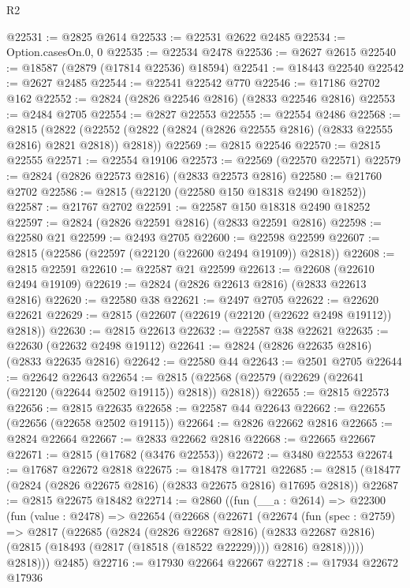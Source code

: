 \begin{lexlean}{R2}
\begin{coremodule}
@22531 := @2825 @2614
@22533 := @22531 @2622 @2485
@22534 := Option.casesOn.{0, 0}
@22535 := @22534 @2478
@22536 := @2627 @2615
@22540 := @18587 (@2879 (@17814 @22536) @18594)
@22541 := @18443 @22540
@22542 := @2627 @2485
@22544 := @22541 @22542 @770
@22546 := @17186 @2702 @162
@22552 := @2824 (@2826 @22546 @2816) (@2833 @22546 @2816)
@22553 := @2484 @2705
@22554 := @2827 @22553
@22555 := @22554 @2486
@22568 := @2815
    (@2822 (@22552 (@2822 (@2824 (@2826 @22555 @2816) (@2833 @22555 @2816) @2821 @2818)) @2818))
@22569 := @2815 @22546
@22570 := @2815 @22555
@22571 := @22554 @19106
@22573 := @22569 (@22570 @22571)
@22579 := @2824 (@2826 @22573 @2816) (@2833 @22573 @2816)
@22580 := @21760 @2702
@22586 := @2815 (@22120 (@22580 @150 @18318 @2490 @18252))
@22587 := @21767 @2702
@22591 := @22587 @150 @18318 @2490 @18252
@22597 := @2824 (@2826 @22591 @2816) (@2833 @22591 @2816)
@22598 := @22580 @21
@22599 := @2493 @2705
@22600 := @22598 @22599
@22607 := @2815 (@22586 (@22597 (@22120 (@22600 @2494 @19109)) @2818))
@22608 := @2815 @22591
@22610 := @22587 @21 @22599
@22613 := @22608 (@22610 @2494 @19109)
@22619 := @2824 (@2826 @22613 @2816) (@2833 @22613 @2816)
@22620 := @22580 @38
@22621 := @2497 @2705
@22622 := @22620 @22621
@22629 := @2815 (@22607 (@22619 (@22120 (@22622 @2498 @19112)) @2818))
@22630 := @2815 @22613
@22632 := @22587 @38 @22621
@22635 := @22630 (@22632 @2498 @19112)
@22641 := @2824 (@2826 @22635 @2816) (@2833 @22635 @2816)
@22642 := @22580 @44
@22643 := @2501 @2705
@22644 := @22642 @22643
@22654 := @2815 (@22568 (@22579 (@22629 (@22641 (@22120 (@22644 @2502 @19115)) @2818)) @2818))
@22655 := @2815 @22573
@22656 := @2815 @22635
@22658 := @22587 @44 @22643
@22662 := @22655 (@22656 (@22658 @2502 @19115))
@22664 := @2826 @22662 @2816
@22665 := @2824 @22664
@22667 := @2833 @22662 @2816
@22668 := @22665 @22667
@22671 := @2815 (@17682 (@3476 @22553))
@22672 := @3480 @22553
@22674 := @17687 @22672 @2818
@22675 := @18478 @17721
@22685 := @2815 (@18477 (@2824 (@2826 @22675 @2816) (@2833 @22675 @2816) @17695 @2818))
@22687 := @2815 @22675 @18482
@22714 := @2860
    ((fun (__a : @2614) =>
    @22300
      (fun (value : @2478) =>
      @22654
        (@22668
          (@22671
            (@22674
              (fun (spec : @2759) =>
              @2817
                (@22685
                  (@2824
                    (@2826 @22687 @2816)
                    (@2833 @22687 @2816)
                    (@2815 (@18493 (@2817 (@18518 (@18522 @22229)))) @2816)
                    @2818)))))
          @2818)))
      @2485)
@22716 := @17930 @22664 @22667
@22718 := @17934 @22672 @17936

\end{coremodule}
\end{lexlean}
